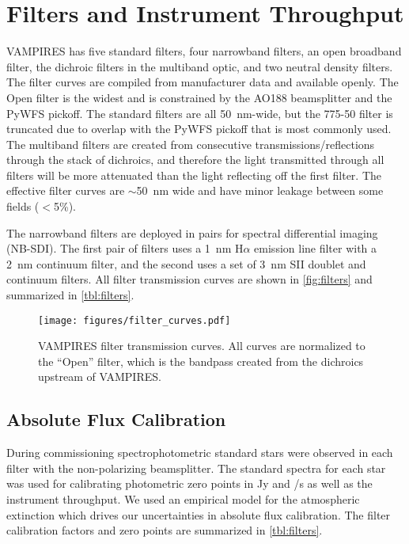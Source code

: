 \section{Filters and Instrument Throughput}\label{sec:filters}

VAMPIRES has five standard filters, four narrowband filters, an open broadband filter, the dichroic filters in the multiband optic, and two neutral density filters. The filter curves are compiled from manufacturer data and available openly. The Open filter is the widest and is constrained by the AO188 beamsplitter and the PyWFS pickoff. The standard filters are all \SI{50}{\nm}-wide, but the 775-50 filter is truncated due to overlap with the PyWFS pickoff that is most commonly used. The multiband filters are created from consecutive transmissions/reflections through the stack of dichroics, and therefore the light transmitted through all filters will be more attenuated than the light reflecting off the first filter. The effective filter curves are $\sim$\SI{50}{\nm} wide and have minor leakage between some fields ($<$5\%).

The narrowband filters are deployed in pairs for spectral differential imaging (NB-SDI). The first pair of filters uses a \SI{1}{\nm} H$\alpha$ emission line filter with a \SI{2}{\nm} continuum filter, and the second uses a set of \SI{3}{\nm} SII doublet and continuum filters. All filter transmission curves are shown in \autoref{fig:filters} and summarized in \autoref{tbl:filters}.

\begin{figure}
    \centering
    \texttt{[image: figures/filter\_curves.pdf]}
    \caption{VAMPIRES filter transmission curves. All curves are normalized to the ``Open'' filter, which is the bandpass created from the dichroics upstream of VAMPIRES.\label{fig:filters}}
\end{figure}

\subsection{Absolute Flux Calibration}

During commissioning spectrophotometric standard stars were observed in each filter with the non-polarizing beamsplitter. The standard spectra for each star was used for calibrating photometric zero points in \si{Jy} and \si{\electron/\second} as well as the instrument throughput. We used an empirical model for the atmospheric extinction \citep{buton_atmospheric_2013} which drives our uncertainties in absolute flux calibration. The filter calibration factors and zero points are summarized in \autoref{tbl:filters}.


